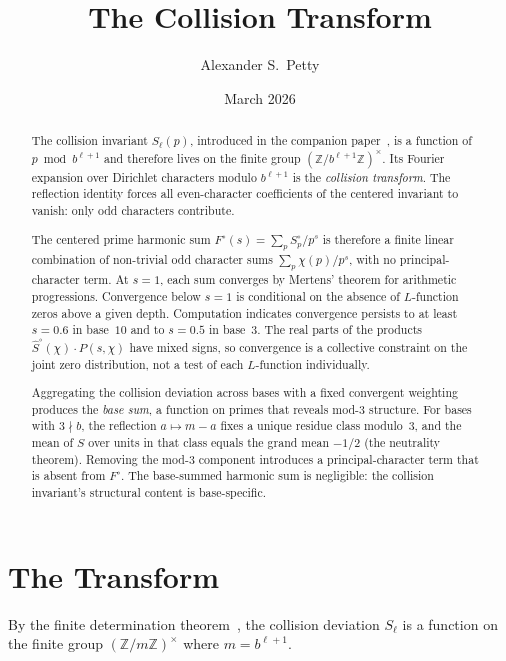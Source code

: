 \documentclass[12pt]{amsart}
\title{The Collision Transform}
\author{Alexander S.\ Petty}
\date{March 2026}
\theoremstyle{definition}
\theoremstyle{remark}
\begin{document}
\begin{abstract}
The collision invariant $S_{\ell}(p)$, introduced in the
companion paper~\cite{paperA}, is a function of
$p \bmod b^{\ell+1}$ and therefore lives on the finite
group $(\mathbb{Z}/b^{\ell+1}\mathbb{Z})^{\times}$. Its
Fourier expansion over Dirichlet characters modulo
$b^{\ell+1}$ is the \emph{collision transform}. The
reflection identity forces all even-character coefficients
of the centered invariant to vanish: only odd characters
contribute.

The centered prime harmonic sum
$F^{\circ}(s) = \sum_p S^{\circ}_p / p^s$ is therefore a
finite linear combination of non-trivial odd character
sums $\sum_p \chi(p)/p^s$, with no principal-character
term. At $s = 1$, each sum converges by Mertens' theorem
for arithmetic progressions. Convergence below $s = 1$
is conditional on the absence of $L$-function zeros
above a given depth. Computation indicates convergence
persists
to at least $s = 0.6$ in base~$10$ and to $s = 0.5$ in
base~$3$. The real parts of the products
$\hat{S}^{\circ}(\chi) \cdot P(s, \chi)$ have mixed
signs, so convergence is a collective constraint on the
joint zero distribution, not a test of each $L$-function
individually.

Aggregating the collision deviation across bases with
a fixed convergent weighting produces the \emph{base sum},
a function on primes that reveals mod-$3$ structure.
For bases with $3 \nmid b$, the reflection
$a \mapsto m - a$ fixes a unique residue class
modulo~$3$, and the mean of $S$ over units in that
class equals the grand mean $-1/2$ (the neutrality
theorem). Removing the mod-$3$ component introduces a
principal-character term that is absent from
$F^{\circ}$. The base-summed harmonic sum is
negligible: the collision invariant's structural
content is base-specific.
\end{abstract}
\maketitle

\section{The Transform}

By the finite determination theorem~\cite{paperA}, the
collision deviation $S_{\ell}$ is a function on the finite
group $(\mathbb{Z}/m\mathbb{Z})^{\times}$ where
$m = b^{\ell+1}$.
\end{document}
